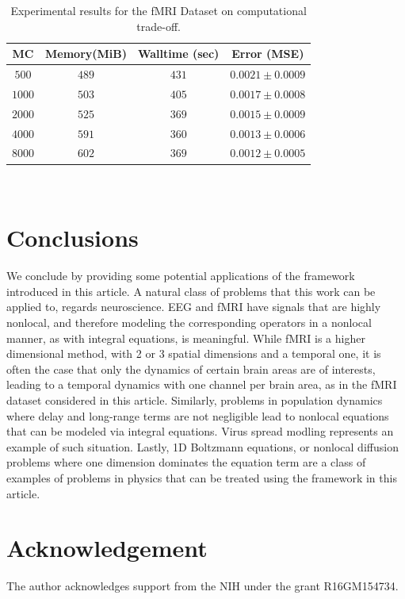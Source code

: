 \documentclass[11pt,fleqn]{amsart} %
\begin{document}
			\begin{table}[h!]
				\centering
				\begin{tabular}{|c | c | c |c|}
					\hline
					MC& Memory(MiB) & Walltime (sec) & Error (MSE) \\
					\hline
					$500$ & $489$ & $431$ & $0.0021 \pm 0.0009$ \\
					\hline
					$1000$ & $503$ & $405$ & $0.0017 \pm 0.0008$\\
					\hline
					$2000$ & $525$ & $369$ & $0.0015 \pm 0.0009$\\
					\hline
					$4000$ & $591$ & $360$ & $0.0013 \pm 0.0006$\\
					\hline
					$8000$ & $602$ & $369$ & $0.0012 \pm 0.0005$\\
					\hline
				\end{tabular}
				\caption{Experimental results for the fMRI Dataset on computational trade-off.}
				\label{Tab:tradeoff_fMRI}
			\end{table}\

			\section{Conclusions}
			
			We conclude by providing some potential applications of the framework introduced in this article. A natural class of problems that this work can be applied to, regards neuroscience. EEG and fMRI have signals that are highly nonlocal, and therefore modeling the corresponding operators in a nonlocal manner, as with integral equations, is meaningful. While fMRI is a higher dimensional method, with 2 or 3 spatial dimensions and a temporal one, it is often the case that only the dynamics of certain brain areas are of interests, leading to a temporal dynamics with one channel per brain area, as in the fMRI dataset considered in this article. 
			Similarly, problems in population dynamics where delay and long-range terms are not negligible lead to nonlocal equations that can be modeled via integral equations. Virus spread modling  represents an example of such situation.  Lastly, 1D Boltzmann equations, or nonlocal diffusion problems where one dimension dominates the equation term are a class of examples of problems in physics that can be treated using the framework in this article.  
			

	\section*{Acknowledgement}
	The author acknowledges support from the NIH under the grant R16GM154734.
	
\end{document}
